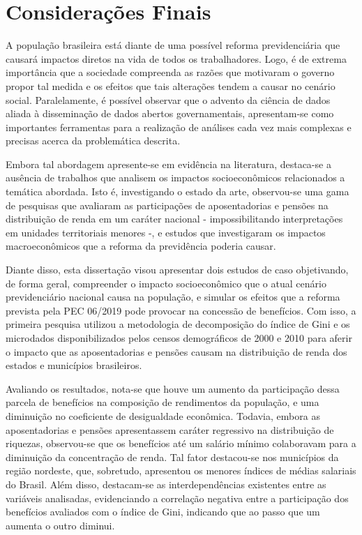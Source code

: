 \chapter{Considerações Finais}\label{cap:conclusao}

A população brasileira está diante de uma possível reforma previdenciária que causará impactos diretos na vida de todos os trabalhadores. Logo, é de extrema importância que a sociedade compreenda as razões que motivaram o governo propor tal medida e os efeitos que tais alterações tendem a causar no cenário social. Paralelamente, é possível observar que o advento da ciência de dados aliada à disseminação de dados abertos governamentais, apresentam-se como importantes ferramentas para a realização de análises cada vez mais complexas e precisas acerca da problemática descrita.

Embora tal abordagem apresente-se em evidência na literatura, destaca-se a ausência de trabalhos que analisem os impactos socioeconômicos relacionados a temática abordada. Isto é, investigando o estado da arte, observou-se uma gama de pesquisas que avaliaram as participações de aposentadorias e pensões na distribuição de renda em um caráter nacional - impossibilitando interpretações em unidades territoriais menores -, e estudos que investigaram os impactos macroeconômicos que a reforma da previdência poderia causar.

Diante disso, esta dissertação visou apresentar dois estudos de caso objetivando, de forma geral, compreender o impacto socioeconômico que o atual cenário previdenciário nacional causa na população, e simular os efeitos que a reforma prevista pela PEC 06/2019 pode provocar na concessão de benefícios. Com isso, a primeira pesquisa utilizou a metodologia de decomposição do índice de Gini e os microdados disponibilizados pelos censos demográficos de 2000 e 2010 para aferir o impacto que as aposentadorias e pensões causam na distribuição de renda dos estados e municípios brasileiros.

Avaliando os resultados, nota-se que houve um aumento da participação dessa parcela de benefícios na composição de rendimentos da população, e uma diminuição no coeficiente de desigualdade econômica. Todavia, embora as aposentadorias e pensões apresentassem caráter regressivo na distribuição de riquezas, observou-se que os benefícios até um salário mínimo colaboravam para a diminuição da concentração de renda. Tal fator destacou-se nos municípios da região nordeste, que, sobretudo, apresentou os menores índices de médias salariais do Brasil. Além disso, destacam-se as interdependências existentes entre as variáveis analisadas, evidenciando a correlação negativa entre a participação dos benefícios avaliados com o índice de Gini, indicando que ao passo que um aumenta o outro diminui.

